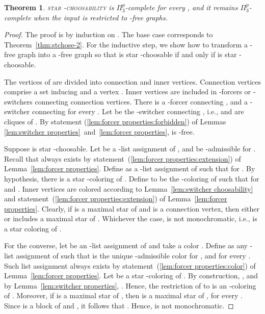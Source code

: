 \documentclass[a4paper, 11pt, oneside]{article}
\newtheorem{theorem}{Theorem}
\newcommand{\stchose}[1]{\textsc{star -choosability}}
\newcommand{\ptp}{\ensuremath{\Pi^p_3}\xspace}
\begin{document}
\begin{theorem} \label{thm:stchose-k}
  \stchose{k} is \ptp-complete for every , and it remains \ptp-complete when the input is restricted to -free graphs.
\end{theorem}

\begin{proof}
  The proof is by induction on .  The base case  corresponds to Theorem~\ref{thm:stchose-2}.  For the inductive step, we show how to transform a -free graph  into a -free graph  so that  is star -choosable if and only if  is star -choosable.  
  
  The vertices of  are divided into connection and inner vertices.  Connection vertices comprise a set  inducing  and a vertex .  Inner vertices are included in -forcers or -switchers connecting connection vertices.  There is a -forcer connecting , and a -switcher connecting  for every .  Let  be the -switcher connecting , i.e.,  and  are cliques of .  By statement (\ref{lem:forcer properties:forbidden}) of Lemmas \ref{lem:switcher properties}~and~\ref{lem:forcer properties},  is -free.  

  Suppose  is star -choosable.  Let  be a -list assignment of , and  be -admissible for .  Recall that  always exists by statement~(\ref{lem:forcer properties:extension}) of Lemma~\ref{lem:forcer properties}.  Define  as a -list assignment of  such that  for .  By hypothesis, there is a star -coloring  of .  Define  to be the -coloring of  such that  for  and .  Inner vertices are colored according to Lemma~\ref{lem:switcher choosability} and statement~(\ref{lem:forcer properties:extension}) of Lemma~\ref{lem:forcer properties}.  Clearly, if  is a maximal star of  and  is a connection vertex, then either  or  includes a maximal star of .  Whichever the case,  is not monochromatic, i.e.,  is a star coloring of .

  For the converse, let  be an -list assignment of  and take a color .  Define  as any -list assignment of  such that  is the unique -admissible color for , and  for every .  Such list assignment always exists by statement~(\ref{lem:forcer properties:color}) of Lemma~\ref{lem:forcer properties}.  Let  be a star -coloring of .  By construction, , and by Lemma~\ref{lem:switcher properties}, .  Hence, the restriction  of  to  is an -coloring of .  Moreover, if  is a maximal star of , then  is a maximal star of , for every .  Since  is a block of  and , it follows that .  Hence,  is not monochromatic.
\end{proof}
\end{document}
